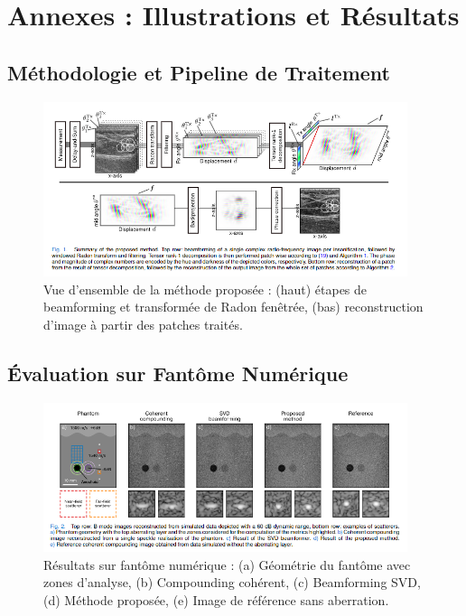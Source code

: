 \documentclass[12pt,a4paper]{article}
\begin{document}
\clearpage
\appendix
\section{Annexes : Illustrations et Résultats}

\subsection{Méthodologie et Pipeline de Traitement}
\begin{figure}[H]
    \centering
    \includegraphics[width=0.95\textwidth]{paper/fig_1.png}
    \caption{Vue d'ensemble de la méthode proposée : (haut) étapes de beamforming et transformée de Radon fenêtrée, (bas) reconstruction d'image à partir des patches traités.}
\end{figure}

\subsection{Évaluation sur Fantôme Numérique}
\begin{figure}[H]
    \centering
    \includegraphics[width=0.95\textwidth]{paper/fig_2.png}
    \caption{Résultats sur fantôme numérique : (a) Géométrie du fantôme avec zones d'analyse, (b) Compounding cohérent, (c) Beamforming SVD, (d) Méthode proposée, (e) Image de référence sans aberration.}
\end{figure}
\end{document}
